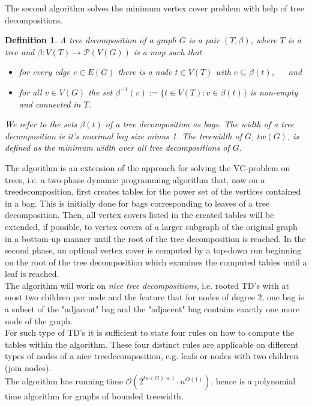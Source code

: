 \documentclass[11pt,a4paper]{article}
\newtheorem*{definition}{Definition}
\begin{document}
The second algorithm solves the minimum vertex cover problem with help of tree decompositions.

\begin{definition}
A \emph{tree decomposition} of a graph $G$ is a pair $(T, \beta)$, where $T$ is a tree and $\beta: V(T) \rightarrow \mathcal{P}(V(G))$ is a map such that
\begin{itemize}
\setlength{\itemindent}{.2in}
\item [(T1)] for every edge $e \in E(G)$ there is a node $t \in V(T)$ with $e \subseteq \beta(t)$, $\quad$ and 
\item [(T2)] for all $v \in V(G)$ the set $\beta^{-1}(v) := \{t \in V(T) : v \in \beta(t)\}$ is non-empty and connected in $T$.
\end{itemize}

\vspace*{2mm}

We refer to the sets $\beta(t)$ of a tree decomposition as \emph{bags}. The width of a tree decomposition is it's maximal bag size minus 1. The \emph{treewidth} of $G$, $tw(G)$, is defined as the minimum width over all tree decompositions of $G$. \\
\end{definition}

The algorithm is an extension of the approach for solving the VC-problem on trees, i.e. a two-phase dynamic programming algorithm that, now on a treedecomposition, first creates tables for the power set of the vertices contained in a bag. This is initially done for bags corresponding to leaves of a tree decomposition. Then, all vertex covers listed in the created tables will be extended, if possible, to vertex covers of a larger subgraph of the original graph in a bottom-up manner until the root of the tree decomposition is reached. In the second phase, an optimal vertex cover is computed by a top-down run beginning on the root of the tree decomposition which examines the computed tables until a leaf is reached. \\
The algorithm will work on \emph{nice tree decompositions}, i.e. rooted TD's with at most two children per node and the feature that for nodes of degree 2, one bag is a subset of the "adjacent" bag and the "adjacent" bag contains exactly one more node of the graph. \\
For such type of TD's it is sufficient to state four rules on how to compute the tables within the algorithm. These four distinct rules are applicable on different types of nodes of a nice  treedecomposition, e.g. leafs or nodes with two children (join nodes). \\
The algorithm has running time $\mathcal{O}(2^{tw(G)+1} \cdot n^{O(1)})$, hence is a polynomial time algorithm for graphs of bounded treewidth. \\ 
\end{document}
